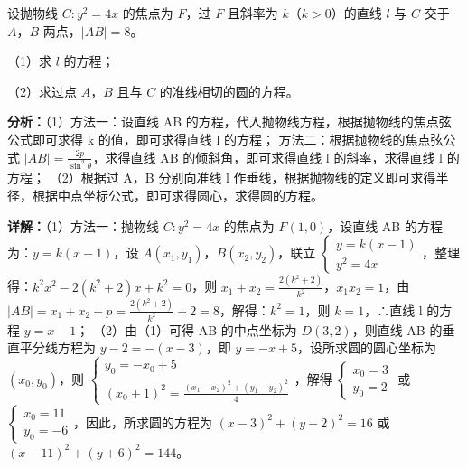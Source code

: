 \begin{question}[points=12]
设抛物线 $C:y^2=4x$ 的焦点为 $F$，过 $F$ 且斜率为 $k$（$k>0$）的直线 $l$ 与 $C$ 交于 $A$，$B$ 两点，$|AB|=8$。

（1）求 $l$ 的方程；

（2）求过点 $A$，$B$ 且与 $C$ 的准线相切的圆的方程。
\begin{solution}

\textbf{分析：}（1）方法一：设直线 AB 的方程，代入抛物线方程，根据抛物线的焦点弦公式即可求得 k 的值，即可求得直线 l 的方程；
方法二：根据抛物线的焦点弦公式 $|AB|=\frac{2p}{\sin^2\theta}$，求得直线 AB 的倾斜角，即可求得直线 l 的斜率，求得直线 l 的方程；
（2）根据过 A，B 分别向准线 l 作垂线，根据抛物线的定义即可求得半径，根据中点坐标公式，即可求得圆心，求得圆的方程。

\textbf{详解：}（1）方法一：抛物线 $C:y^2=4x$ 的焦点为 $F(1,0)$，设直线 AB 的方程为：$y=k(x-1)$，设 $A(x_1,y_1)$，$B(x_2,y_2)$，联立 $\begin{cases} y=k(x-1) \\ y^2=4x \end{cases}$，整理得：$k^2x^2-2(k^2+2)x+k^2=0$，则 $x_1+x_2=\frac{2(k^2+2)}{k^2}$，$x_1x_2=1$，由 $|AB|=x_1+x_2+p=\frac{2(k^2+2)}{k^2}+2=8$，解得：$k^2=1$，则 $k=1$，∴直线 l 的方程 $y=x-1$；
（2）由（1）可得 AB 的中点坐标为 $D(3,2)$，则直线 AB 的垂直平分线方程为 $y-2=-(x-3)$，即 $y=-x+5$，设所求圆的圆心坐标为 $(x_0,y_0)$，则 $\begin{cases} y_0=-x_0+5 \\ (x_0+1)^2=\frac{(x_1-x_2)^2+(y_1-y_2)^2}{4} \end{cases}$，解得 $\begin{cases} x_0=3 \\ y_0=2 \end{cases}$ 或 $\begin{cases} x_0=11 \\ y_0=-6 \end{cases}$，因此，所求圆的方程为 $(x-3)^2+(y-2)^2=16$ 或 $(x-11)^2+(y+6)^2=144$。
\end{solution}
\end{question}

